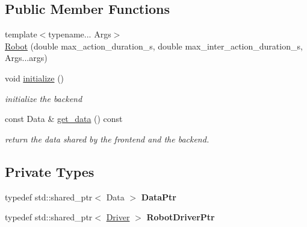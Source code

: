\subsection*{Public Member Functions}
\begin{DoxyCompactItemize}
\item 
{\footnotesize template$<$typename... Args$>$ }\\\hyperlink{classrobot__interfaces_1_1Robot_a98609b8d6807e4407ab8d735a2dd412c}{Robot} (double max\+\_\+action\+\_\+duration\+\_\+s, double max\+\_\+inter\+\_\+action\+\_\+duration\+\_\+s, Args...\+args)
\item 
void \hyperlink{classrobot__interfaces_1_1Robot_af2d47a88a06f94e90bc0145ba1171cd0}{initialize} ()\hypertarget{classrobot__interfaces_1_1Robot_af2d47a88a06f94e90bc0145ba1171cd0}{}\label{classrobot__interfaces_1_1Robot_af2d47a88a06f94e90bc0145ba1171cd0}

\begin{DoxyCompactList}\small\item\em initialize the backend \end{DoxyCompactList}\item 
const Data \& \hyperlink{classrobot__interfaces_1_1Robot_a0f6854c5fe090ac0d675e0bf74afc953}{get\+\_\+data} () const \hypertarget{classrobot__interfaces_1_1Robot_a0f6854c5fe090ac0d675e0bf74afc953}{}\label{classrobot__interfaces_1_1Robot_a0f6854c5fe090ac0d675e0bf74afc953}

\begin{DoxyCompactList}\small\item\em return the data shared by the frontend and the backend. \end{DoxyCompactList}\end{DoxyCompactItemize}
\subsection*{Private Types}
\begin{DoxyCompactItemize}
\item 
typedef std\+::shared\+\_\+ptr$<$ Data $>$ {\bfseries Data\+Ptr}\hypertarget{classrobot__interfaces_1_1Robot_aae6cdfcef2853a056a6f7d7d2356b7df}{}\label{classrobot__interfaces_1_1Robot_aae6cdfcef2853a056a6f7d7d2356b7df}

\item 
typedef std\+::shared\+\_\+ptr$<$ \hyperlink{classDriver}{Driver} $>$ {\bfseries Robot\+Driver\+Ptr}\hypertarget{classrobot__interfaces_1_1Robot_a8aa32d96551cdd9234288203b1790f6d}{}\label{classrobot__interfaces_1_1Robot_a8aa32d96551cdd9234288203b1790f6d}

\end{DoxyCompactItemize}
